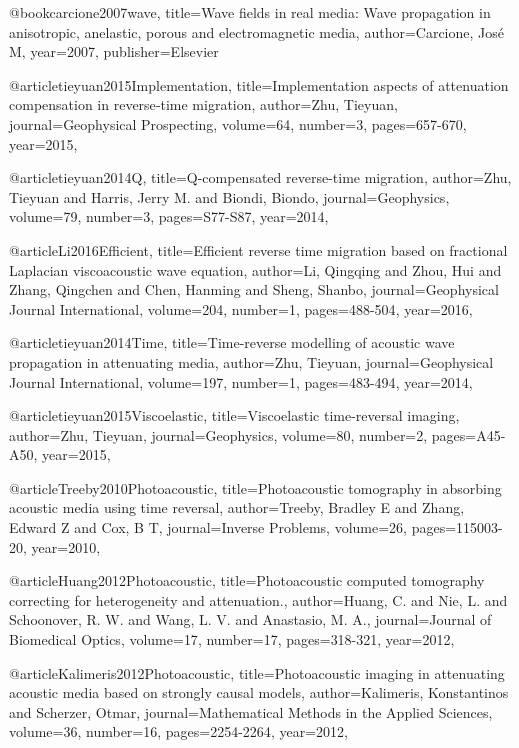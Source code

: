 {@book{carcione2007wave,
  title={Wave fields in real media: Wave propagation in anisotropic, anelastic, porous and electromagnetic media},
  author={Carcione, Jos{\'e} M},
  year={2007},
  publisher={Elsevier}
}

@article{tieyuan2015Implementation,
  title={Implementation aspects of attenuation compensation in reverse‐time migration},
  author={Zhu, Tieyuan},
  journal={Geophysical Prospecting},
  volume={64},
  number={3},
  pages={657-670},
  year={2015},
}

@article{tieyuan2014Q,
  title={Q-compensated reverse-time migration},
  author={Zhu, Tieyuan and Harris, Jerry M. and Biondi, Biondo},
  journal={Geophysics},
  volume={79},
  number={3},
  pages={S77-S87},
  year={2014},
}

@article{Li2016Efficient,
  title={Efficient reverse time migration based on fractional {L}aplacian viscoacoustic wave equation},
  author={Li, Qingqing and Zhou, Hui and Zhang, Qingchen and Chen, Hanming and Sheng, Shanbo},
  journal={Geophysical Journal International},
  volume={204},
  number={1},
  pages={488-504},
  year={2016},
}

@article{tieyuan2014Time,
  title={Time-reverse modelling of acoustic wave propagation in attenuating media},
  author={Zhu, Tieyuan},
  journal={Geophysical Journal International},
  volume={197},
  number={1},
  pages={483-494},
  year={2014},
}

@article{tieyuan2015Viscoelastic,
  title={Viscoelastic time-reversal imaging},
  author={Zhu, Tieyuan},
  journal={Geophysics},
  volume={80},
  number={2},
  pages={A45-A50},
  year={2015},
}

@article{Treeby2010Photoacoustic,
  title={Photoacoustic tomography in absorbing acoustic media using time reversal},
  author={Treeby, Bradley E and Zhang, Edward Z and Cox, B T},
  journal={Inverse Problems},
  volume={26},
  pages={115003-20},
  year={2010},
}

@article{Huang2012Photoacoustic,
  title={Photoacoustic computed tomography correcting for heterogeneity and attenuation.},
  author={Huang, C. and Nie, L. and Schoonover, R. W. and Wang, L. V. and Anastasio, M. A.},
  journal={Journal of Biomedical Optics},
  volume={17},
  number={17},
  pages={318-321},
  year={2012},
}

@article{Kalimeris2012Photoacoustic,
  title={Photoacoustic imaging in attenuating acoustic media based on strongly causal models},
  author={Kalimeris, Konstantinos and Scherzer, Otmar},
  journal={Mathematical Methods in the Applied Sciences},
  volume={36},
  number={16},
  pages={2254-2264},
  year={2012},
}

}
